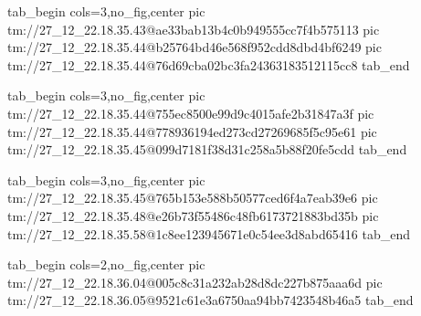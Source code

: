 
 
 
 
 

\qqSecCmtScr


\ifcmt
  tab_begin cols=3,no_fig,center
    pic tm://27_12_22.18.35.43@ae33bab13b4c0b949555cc7f4b575113
    pic tm://27_12_22.18.35.44@b25764bd46e568f952cdd8dbd4bf6249
    pic tm://27_12_22.18.35.44@76d69cba02bc3fa24363183512115cc8
  tab_end
\fi


\ifcmt
  tab_begin cols=3,no_fig,center
    pic tm://27_12_22.18.35.44@755ec8500e99d9c4015afe2b31847a3f
    pic tm://27_12_22.18.35.44@778936194ed273cd27269685f5c95e61
    pic tm://27_12_22.18.35.45@099d7181f38d31c258a5b88f20fe5cdd
  tab_end
\fi


\ifcmt
  tab_begin cols=3,no_fig,center
    pic tm://27_12_22.18.35.45@765b153e588b50577ced6f4a7eab39e6
    pic tm://27_12_22.18.35.48@e26b73f55486c48fb6173721883bd35b
    pic tm://27_12_22.18.35.58@1c8ee123945671e0c54ee3d8abd65416
  tab_end
\fi


\ifcmt
  tab_begin cols=2,no_fig,center
    pic tm://27_12_22.18.36.04@005c8c31a232ab28d8dc227b875aaa6d
    pic tm://27_12_22.18.36.05@9521c61e3a6750aa94bb7423548b46a5
  tab_end
\fi

